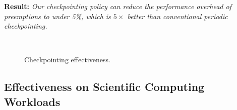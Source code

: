\noindent \textbf{Result:} \emph{Our checkpointing policy can reduce the performance overhead of preemptions to under 5\%, which is $5\times$ better than conventional periodic checkpointing.}


\begin{figure}[t]
  \vspace*{\myfigspace}
\\
\vspace*{-8pt}
\vspace*{\myfigspace}
  \caption{Checkpointing effectiveness.}
  \label{fig:ckpt-all}
  \vspace*{\myfigspace}
\end{figure}





\vspace*{\subsecspace}
\subsection{Effectiveness on Scientific Computing Workloads}

